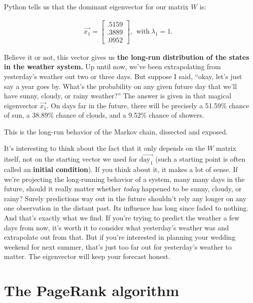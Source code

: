 \begin{alttitles}
Python tells us that the dominant eigenvector for our matrix $W$ is:

\vspace{-.15in}
\begin{align*}
\overrightarrow{x_1} = \begin{bmatrix} .5159 \\ .3889 \\ .0952 \end{bmatrix},
\ \ \textrm{with} \ \lambda_1 = 1.
\end{align*}
\vspace{-.15in}

Believe it or not, this vector gives us \textbf{the long-run distribution of
the states in the weather system.} Up until now, we've been extrapolating from
yesterday's weather out two or three days. But suppose I said, ``okay, let's
just say a year goes by. What's the probability on any given future day that
we'll have sunny, cloudy, or rainy weather?'' The answer is given in that
magical eigenvector $\overrightarrow{x_1}$. On days far in the future, there
will be precisely a 51.59\% chance of sun, a 38.89\% chance of clouds, and a
9.52\% chance of showers.


This is the long-run behavior of the Markov chain, dissected and exposed.

It's interesting to think about the fact that it only depends on the $W$ matrix
itself, not on the starting vector we used for
$\overrightarrow{\textrm{day}_1}$ (such a starting point is often called an
\textbf{initial condition}). If you think about it, it makes a lot of sense. If
we're projecting the long-running behavior of a system, many many days in the
future, should it really matter whether \textit{today} happened to be sunny,
cloudy, or rainy? Surely predictions way out in the future shouldn't rely any
longer on any one observation in the distant past. Its influence has long since
faded to nothing. And that's exactly what we find. If you're trying to predict
the weather a few days from now, it's worth it to consider what yesterday's
weather was and extrapolate out from that. But if you're interested in planning
your wedding weekend for next summer, that's just too far out for yesterday's
weather to matter. The eigenvector will keep your forecast honest.

\vfill
\pagebreak

\renewcommand{\thesubsection}{P\arabic{subsection}.}%
\section{The PageRank algorithm}


\end{alttitles}
